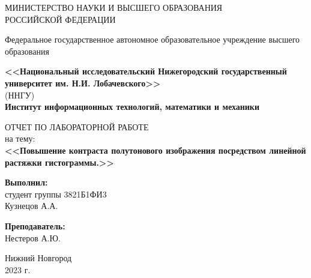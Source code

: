 \begin{titlepage}
	\begin{center}
		\large
		{МИНИСТЕРСТВО НАУКИ И ВЫСШЕГО ОБРАЗОВАНИЯ\\ РОССИЙСКОЙ ФЕДЕРАЦИИ}
		
		Федеральное государственное автономное образовательное учреждение высшего образования
		\vspace{0.5cm}
		
		\textbf{<<Национальный исследовательский Нижегородский государственный университет им. Н.И. Лобачевского>>}\\
		(ННГУ)\\
		\vspace{1cm}
		\textbf{Институт информационных технологий, математики и механики}\\
		\vfill
		
		\Large
		ОТЧЕТ ПО ЛАБОРАТОРНОЙ РАБОТЕ\\
		на тему:\\
		\textbf{<<Повышение контраста полутонового изображения посредством 
линейной растяжки гистограммы.>>}
		{\LARGE 
		}
		\bigskip
		
		
	\end{center}
	\vfill
	
	\newlength{\ML}
	\hfill\begin{minipage}{0.4\textwidth}
		\textbf{Выполнил:}\\
		студент группы 3821Б1ФИ3\\
		\underline{\hspace{3cm}} Кузнецов А.А.\\
	\end{minipage}%
	\bigskip
	
	\hfill\begin{minipage}{0.4\textwidth}
		\textbf{Преподаватель:}\\
		\underline{\hspace{3cm}} Нестеров А.Ю. \\
	\end{minipage}%
	\vfill
	
	\begin{center}
		Нижний Новгород\\
		2023 г.
	\end{center}
\end{titlepage}